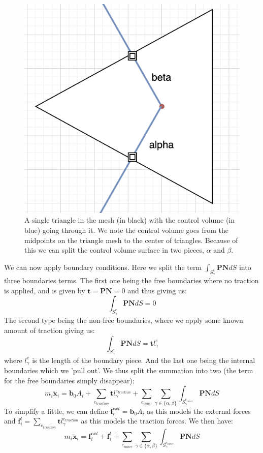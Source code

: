 \begin{figure}
	\centering
	\includegraphics[width=0.4\linewidth]{Materials/controlvolume}
	\caption{A single triangle in the mesh (in black) with the control volume (in blue) going through it. We note the control volume goes from the midpoints on the triangle mesh to the center of triangles. Because of this we can split the control volume surface in two pieces, $\alpha$ and $\beta$.}
	\label{controlvolume}
\end{figure}

We can now apply boundary conditions. Here we split the term $\int_{S^e_\gamma}\mathbf{P}\mathbf{N}dS$ into three boundaries terms. The first one being the free boundaries where no traction is applied, and is given by $\mathbf{t} = \mathbf{P}\mathbf{N} = 0$ and thus giving us:
\begin{equation*}
	\int_{S^e_\gamma}\mathbf{P}\mathbf{N}dS = 0
\end{equation*}
The second type being the non-free boundaries, where we apply some known amount of traction giving us:
\begin{equation*}
	\int_{S^e_\gamma}\mathbf{P}\mathbf{N}dS = \mathbf{t}l^e_\gamma
\end{equation*}
where $l^e_\gamma$ is the length of the boundary piece. And the last one being the internal boundaries which we 'pull out'. We thus split the summation into two (the term for the free boundaries simply disappear):
\begin{equation*}
	m_i\ddot{\mathbf{x}}_i = \mathbf{b}_0A_i + \sum_{e_{traction}}  \mathbf{t}l^{e_{traction}}_\gamma + \sum_{e_{inner}} \sum_{\gamma\in \{\alpha,\beta\}} \int_{S^{e_{inner}}_\gamma}\mathbf{P}\mathbf{N}dS
\end{equation*} 
To simplify a little, we can define $\mathbf{f}^{ext}_i =  \mathbf{b}_0A_i$ as this models the external forces and $\mathbf{f}^t_i = \sum_{e_{traction}}  \mathbf{t}l^{e_{traction}}_\gamma$ as this models the traction forces. We then have:
\begin{equation*}
	m_i\ddot{\mathbf{x}}_i = \mathbf{f}^{ext}_i + \mathbf{f}^t_i + \sum_{e_{inner}} \sum_{\gamma\in \{\alpha,\beta\}} \int_{S^{e_{inner}}_\gamma}\mathbf{P}\mathbf{N}dS
\end{equation*}

